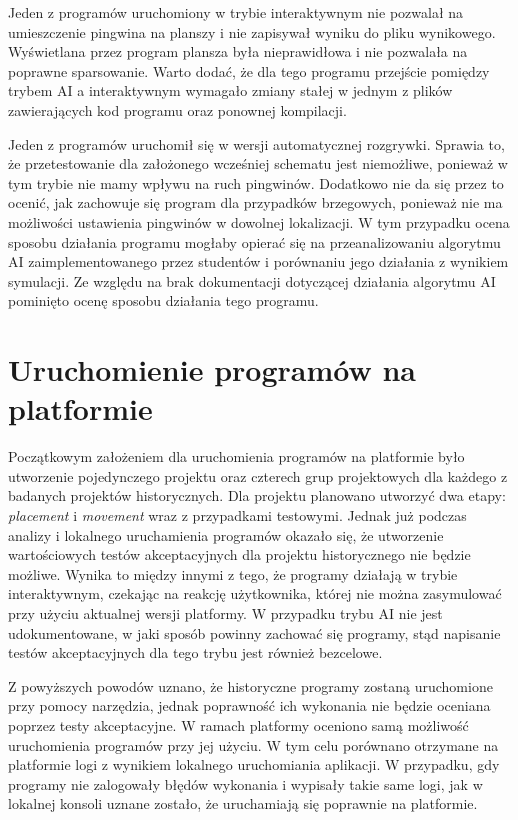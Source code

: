 Jeden z programów uruchomiony w trybie interaktywnym nie pozwalał na umieszczenie pingwina na planszy i nie zapisywał wyniku do pliku wynikowego.
Wyświetlana przez program plansza była nieprawidłowa i nie pozwalała na poprawne sparsowanie.
Warto dodać, że dla tego programu przejście pomiędzy trybem AI a interaktywnym wymagało zmiany stałej w jednym z plików zawierających kod programu oraz ponownej kompilacji.

Jeden z programów uruchomił się w wersji automatycznej rozgrywki.
Sprawia to, że przetestowanie dla założonego wcześniej schematu jest niemożliwe, ponieważ w tym trybie nie mamy wpływu na ruch pingwinów.
Dodatkowo nie da się przez to ocenić, jak zachowuje się program dla przypadków brzegowych, ponieważ nie ma możliwości ustawienia pingwinów w dowolnej lokalizacji.
W tym przypadku ocena sposobu działania programu mogłaby opierać się na przeanalizowaniu algorytmu AI zaimplementowanego przez studentów i porównaniu jego działania z wynikiem symulacji.
Ze względu na brak dokumentacji dotyczącej działania algorytmu AI pominięto ocenę sposobu działania tego programu.

\section{Uruchomienie programów na platformie}
\label{veryfication_platform}

Początkowym założeniem dla uruchomienia programów na platformie było utworzenie pojedynczego projektu oraz czterech grup projektowych dla każdego z badanych projektów historycznych.
Dla projektu planowano utworzyć dwa etapy: \textit{placement} i \textit{movement} wraz z przypadkami testowymi.
Jednak już podczas analizy i lokalnego uruchamienia programów okazało się, że utworzenie wartościowych testów akceptacyjnych dla projektu historycznego nie będzie możliwe.
Wynika to między innymi z tego, że programy działają w trybie interaktywnym, czekając na reakcję użytkownika, której nie można zasymulować przy użyciu aktualnej wersji platformy.
W przypadku trybu AI nie jest udokumentowane, w jaki sposób powinny zachować się programy, stąd napisanie testów akceptacyjnych dla tego trybu jest również bezcelowe.

Z powyższych powodów uznano, że historyczne programy zostaną uruchomione przy pomocy narzędzia, jednak poprawność ich wykonania nie będzie oceniana poprzez testy akceptacyjne.
W ramach platformy oceniono samą możliwość uruchomienia programów przy jej użyciu.
W tym celu porównano otrzymane na platformie logi z wynikiem lokalnego uruchomiania aplikacji.
W przypadku, gdy programy nie zalogowały błędów wykonania i wypisały takie same logi, jak w lokalnej konsoli uznane zostało, że uruchamiają się poprawnie na platformie.

